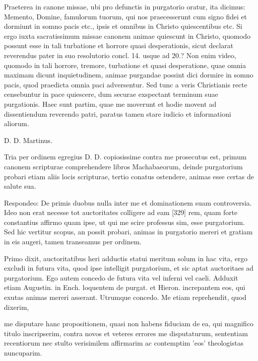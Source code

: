 Praeterea in canone missae, ubi pro defunctis in purgatorio oratur, ita dicimus: Memento, Domine, famulorum tuorum, qui nos praecesserunt cum signo fidei et dormiunt in somno pacis etc., ipsis et omnibus in Christo quiescentibus etc. Si ergo iuxta sacratissimum missae canonem animae quiescunt in Christo, quomodo possunt esse in tali turbatione et horrore quasi desperationis, sicut declarat reverendus pater in suo resolutorio concl. 14. usque ad 20.? Non enim video, quomodo in tali horrore, tremore, turbatione et quasi desperatione, quae omnia maximam dicunt inquietudinem, animae purgandae possint dici dormire in somno pacis, quod praedicta omnia paci adversentur. Sed tunc a veris Christianis recte censebuntur in pace quiescere, dum securae exspectant terminum suae purgationis. Haec sunt partim, quae me moverunt et hodie movent ad dissentiendum reverendo patri, paratus tamen stare iudicio et informationi aliorum.

D. D. Martinus.

Tria per ordinem egregius D. D. copiosissime contra me prosecutus est, primum canonem scripturae comprehendere libros Machabaeorum, deinde purgatorium probari etiam aliis locis scripturae, tertio conatus ostendere, animas esse certas de salute sua.

Respondeo: De primis duobus nulla inter me et dominationem suam controversia. Ideo non erat necesse tot auctoritates colligere ad eam [329] rem, quam forte constantius affirmo quam ipse, ut qui me scire professus sim, esse purgatorium. Sed hic vertitur scopus, an possit probari, animas in purgatorio mereri et gratiam in eis augeri, tamen transeamus per ordinem.

Primo dixit, auctoritatibus heri adductis statui meritum solum in hac vita, ergo excludi in futura vita, quod ipse intelligit purgatorium, et sic aptat auctoritaes ad purgatorium. Ego autem concedo de futura vita vel inferni vel caeli. Adduxit etiam Augustin. in Ench. loquentem de purgat. et Hieron. increpantem eos, qui exutas animas mereri asserant. Utrumque concedo. Me etiam reprehendit, quod dixerim,

me disputare hanc propositionem, quasi non habens fiduciam de ea, qui magnifico titulo inscripserim, contra novos et veteres errores me disputaturum, sententiam recentiorum nec stulto verisimilem affirmarim ac contemptim 'eos' theologistas nuncuparim.

